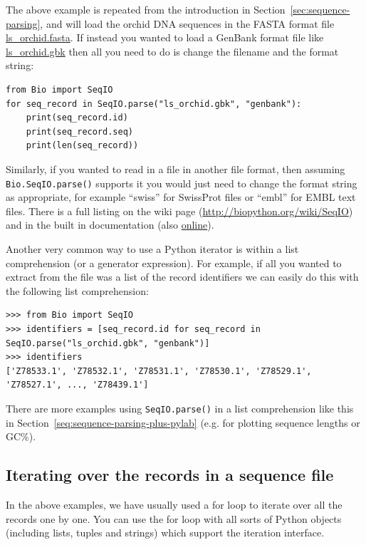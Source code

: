 \documentclass{report}
\begin{document}
The above example is repeated from the introduction in Section~\ref{sec:sequence-parsing}, and will load the orchid DNA sequences in the FASTA format file \href{http://biopython.org/DIST/docs/tutorial/examples/ls_orchid.fasta}{ls\_orchid.fasta}.  If instead you wanted to load a GenBank format file like \href{http://biopython.org/DIST/docs/tutorial/examples/ls_orchid.gbk}{ls\_orchid.gbk} then all you need to do is change the filename and the format string:

\begin{verbatim}
from Bio import SeqIO
for seq_record in SeqIO.parse("ls_orchid.gbk", "genbank"):
    print(seq_record.id)
    print(seq_record.seq)
    print(len(seq_record))
\end{verbatim}

Similarly, if you wanted to read in a file in another file format, then assuming \verb|Bio.SeqIO.parse()| supports it you would just need to change the format string as appropriate, for example ``swiss'' for SwissProt files or ``embl'' for EMBL text files. There is a full listing on the wiki page (\url{http://biopython.org/wiki/SeqIO}) and in the built in documentation (also \href{http://biopython.org/DIST/docs/api/Bio.SeqIO-module.html}{online}).

Another very common way to use a Python iterator is within a list comprehension (or
a generator expression).  For example, if all you wanted to extract from the file was
a list of the record identifiers we can easily do this with the following list comprehension:

\begin{verbatim}
>>> from Bio import SeqIO
>>> identifiers = [seq_record.id for seq_record in SeqIO.parse("ls_orchid.gbk", "genbank")]
>>> identifiers
['Z78533.1', 'Z78532.1', 'Z78531.1', 'Z78530.1', 'Z78529.1', 'Z78527.1', ..., 'Z78439.1']
\end{verbatim}

\noindent There are more examples using \verb|SeqIO.parse()| in a list
comprehension like this in Section~\ref{seq:sequence-parsing-plus-pylab}
(e.g. for plotting sequence lengths or GC\%).

\subsection{Iterating over the records in a sequence file}

In the above examples, we have usually used a for loop to iterate over all the records one by one.  You can use the for loop with all sorts of Python objects (including lists, tuples and strings) which support the iteration interface.
\end{document}
